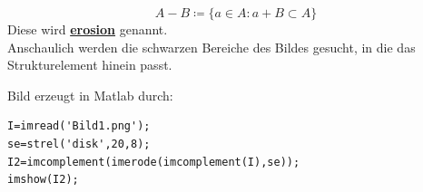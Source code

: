 \documentclass{article}
\theoremstyle{plain}
\theoremstyle{definition}
\numberwithin{equation}{section}
\newcommand{\mim}[1] {
\underline{\textbf{#1\index{#1}}}
}
\begin{document}
        \[A-B  \coloneqq  \{a \in A: a + B \subset A\}\]
        Diese wird \mim{erosion} genannt.\\
        Anschaulich werden die schwarzen Bereiche des Bildes gesucht, in die das Strukturelement hinein passt.
        \begin{center}
        \end{center}

        Bild erzeugt in Matlab durch:\\
        \begin{lstlisting}
I=imread('Bild1.png');
se=strel('disk',20,8);
I2=imcomplement(imerode(imcomplement(I),se));
imshow(I2);
        \end{lstlisting}
\end{document}
